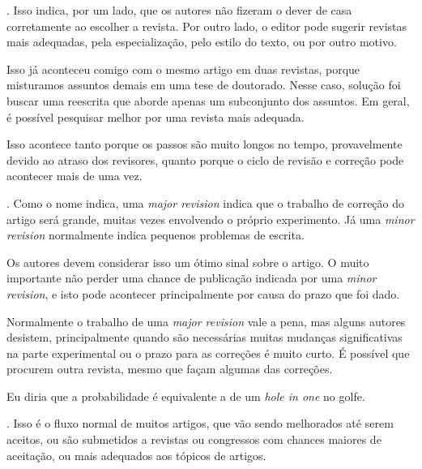 \documentclass[openany]{book}
\begin{document}
. Isso indica, por um lado, que os autores não fizeram o dever de casa corretamente ao escolher a revista. Por outro lado, o editor pode sugerir revistas mais adequadas, pela especialização, pelo estilo do texto, ou por outro motivo.


 Isso já aconteceu comigo com o mesmo artigo em duas revistas, porque misturamos assuntos demais em uma tese de doutorado. Nesse caso, solução foi buscar uma reescrita que aborde apenas um subconjunto dos assuntos. Em geral, é possível pesquisar melhor por uma revista mais adequada.

 Isso acontece tanto porque os passos são muito longos no tempo, provavelmente devido ao atraso dos revisores, quanto porque o ciclo de revisão e correção pode acontecer mais de uma vez.

. Como o nome indica, uma \textit{major revision} indica que o trabalho de correção do artigo será grande, muitas vezes envolvendo o próprio experimento. Já uma \textit{minor revision} normalmente indica pequenos problemas de escrita.

 Os autores devem considerar isso um ótimo sinal sobre o artigo. O muito importante não perder uma chance de publicação indicada por uma \textit{minor revision}, e isto pode acontecer principalmente por causa do prazo que foi dado.

 Normalmente o trabalho de uma \textit{major revision} vale a pena, mas alguns autores desistem, principalmente quando são necessárias muitas mudanças significativas na parte experimental ou o prazo para as correções é muito curto. É possível que procurem outra revista, mesmo que façam algumas das correções.

 Eu diria que a probabilidade é equivalente a de um \textit{hole in one} no golfe.

. Isso é o fluxo normal de muitos artigos, que vão sendo melhorados até serem aceitos, ou são submetidos a revistas ou congressos com chances maiores de aceitação, ou mais adequados aos tópicos de artigos.
\end{document}

